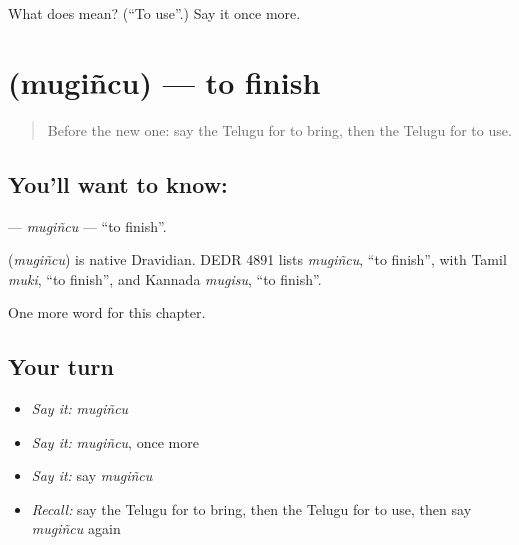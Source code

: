 \begin{tcolorbox}[breakable,colback=teal!4,colframe=teal!35!black,title={Before you move on}]
What does  mean? (\textquotedblleft{}To use\textquotedblright{}.) Say it once more.
\end{tcolorbox}
\section[\texorpdfstring{\te{ముగించు} (mugiñcu)}{ముగించు (mugiñcu)}]{ (mugiñcu) — to finish}

\label{lesson:TE-C242-mugincu}



\begin{quote}
Before the new one: say the Telugu for to bring, then the Telugu for to use.
\end{quote}

\subsection*{You'll want to know: }
\textbf{} — \emph{mugiñcu} — \textquotedblleft{}to finish\textquotedblright{}.

\begin{cousinweb}
\textbf{} (\emph{mugiñcu}) is native Dravidian. DEDR 4891 lists \emph{mugiñcu}, \textquotedblleft{}to finish\textquotedblright{}, with Tamil \emph{muki}, \textquotedblleft{}to finish\textquotedblright{}, and Kannada \emph{mugisu}, \textquotedblleft{}to finish\textquotedblright{}.
\end{cousinweb}

\begin{grammarlens}[title={What you've built}]
One more word for this chapter.
\end{grammarlens}

\subsection*{Your turn}
\begin{itemize}
\raggedright
  \item \emph{Say it:} \emph{mugiñcu}
  \item \emph{Say it:} \emph{mugiñcu}, once more
  \item \emph{Say it:} say \emph{mugiñcu}
  \item \emph{Recall:} say the Telugu for to bring, then the Telugu for to use, then say \emph{mugiñcu} again
\end{itemize}

